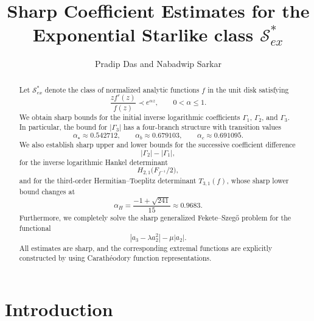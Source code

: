 \documentclass[11pt,reqno]{amsart}
\numberwithin{equation}{section}
\begin{document}
\title[Sharp Coefficient Estimates for the Exponential Starlike class $\mathcal{S}_{ex}^{\ast}$]{Sharp Coefficient Estimates for the Exponential Starlike class $\mathcal{S}_{ex}^{\ast}$}
\author[P. Das and N. Sarkar]{Pradip Das and Nabadwip Sarkar}
\address{Department of Mathematics, Raiganj University, Raiganj, West Bengal-733134, India.}
\address{Amity School of Applied Sciences, Amity University Mumbai, Panvel, Navi Mumbai, Maharashtra-410206, India}
\makeatletter
{}
\makeatother


\begin{abstract}
Let $\mathcal{S}_{ex}^{\ast}$ denote the class of normalized analytic functions $f$ in the unit disk satisfying
\[
\frac{zf'(z)}{f(z)} \prec e^{\alpha z},\qquad 0<\alpha\le 1.
\]
We obtain sharp bounds for the initial inverse logarithmic coefficients $\Gamma_1$, $\Gamma_2$, and $\Gamma_3$. In particular, the bound for $|\Gamma_3|$ has a four-branch structure with transition values
\[
\alpha_\star \approx 0.542712,\qquad
\alpha_b \approx 0.679103,\qquad
\alpha_c \approx 0.691095.
\]
We also establish sharp upper and lower bounds for the successive coefficient difference
\[
|\Gamma_2|-|\Gamma_1|,
\]
for the inverse logarithmic Hankel determinant
\[
H_{2,1}\bigl(F_{f^{-1}}/2\bigr),
\]
and for the third-order Hermitian--Toeplitz determinant $T_{3,1}(f)$, whose sharp lower bound changes at
\[
\alpha_H=\frac{-1+\sqrt{241}}{15}\approx0.9683.
\]
Furthermore, we completely solve the sharp generalized Fekete--Szeg\H{o} problem for the functional
\[
|a_3-\lambda a_2^2|-\mu|a_2|.
\]
All estimates are sharp, and the corresponding extremal functions are explicitly constructed by using Carath\'eodory function representations.
\end{abstract}
\maketitle
\section{Introduction}
\end{document}
